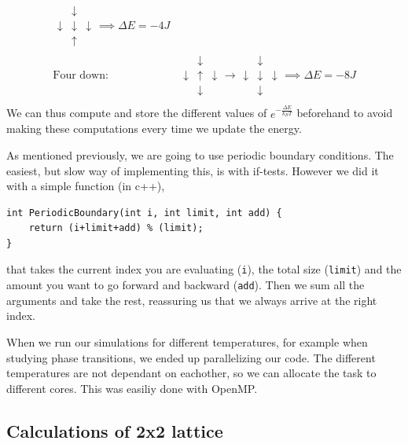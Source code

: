 \documentclass[reprint, english,notitlepage,nofootinbib]{revtex4-1}  %
\begin{document}
\begin{align*}
	\begin{matrix}
	& \downarrow  \\
	\downarrow & \downarrow & \downarrow \\
	& \uparrow
	\end{matrix}
	\implies
	\Delta E = -4J \\
	\text{Four down: }
		&\begin{matrix}
	& \downarrow  \\
	\downarrow & \uparrow & \downarrow \\
	& \downarrow
	\end{matrix}
	\rightarrow
	\begin{matrix}
	& \downarrow  \\
	\downarrow & \downarrow & \downarrow \\
	& \downarrow
	\end{matrix}
	\implies
	\Delta E = -8J \\
\end{align*}
We can thus compute and store the different values of $e^{- \frac{\Delta E}{k_BT}}$ beforehand to avoid making these computations every time we update the energy.

As mentioned previously, we are going to use periodic boundary conditions. The easiest, but slow way of implementing this, is with if-tests. However we did it with a simple function (in c++),
\begin{lstlisting}
int PeriodicBoundary(int i, int limit, int add) {
	return (i+limit+add) % (limit);
}
\end{lstlisting}
that takes the current index you are evaluating (\texttt{i}), the total size (\texttt{limit}) and the amount you want to go forward and backward (\texttt{add}). Then we sum all the arguments and take the rest, reassuring us that we always arrive at the right index.

When we run our simulations for different temperatures, for example when studying phase transitions, we ended up parallelizing our code. The different temperatures are not dependant on eachother, so we can allocate the task to different cores. This was easiliy done with OpenMP.

\subsection{Calculations of 2x2 lattice} \label{calc_of_22_lattice}
\end{document}
